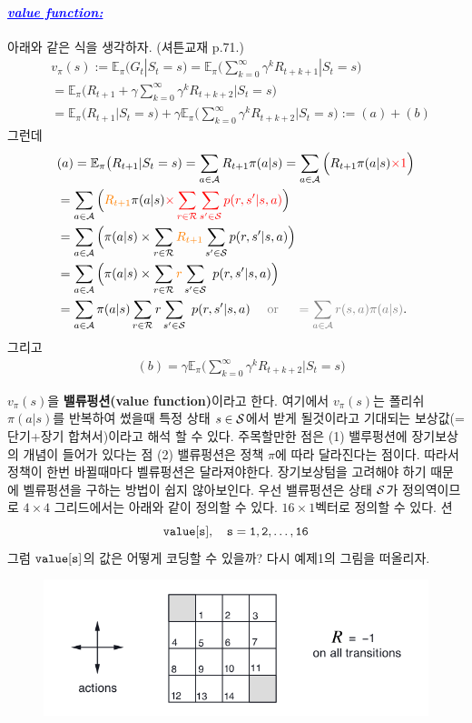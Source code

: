 \documentclass[12pt,oneside,english,a4paper]{article}
\newcommand{\parablue}[1]{\paragraph{\Large\textcolor{blue}{\it\underline{\textbf{#1:}}}}\Large}
\begin{document}
\parablue{value function} 아래와 같은 식을 생각하자. (셔튼교재 p.71.)
\begin{align*}
& v_{\pi}(s):=\mathbb{E}_{\pi}(G_t|S_t=s)= \mathbb{E}_{\pi} \Big( \sum_{k=0}^{\infty}\gamma^k R_{t+k+1} | S_t=s\Big)\\ 
&=\mathbb{E}_{\pi} \Big(R_{t+1}+\gamma \sum_{k=0}^{\infty}\gamma^k R_{t+k+2} | S_t=s\Big)\\
&=\mathbb{E}_{\pi} \big(R_{t+1}|S_t=s)+\gamma \mathbb{E}_{\pi}\Big(\sum_{k=0}^{\infty}\gamma^k R_{t+k+2} \Big| S_t=s\Big):=(a)+(b)
\end{align*}
그런데 
\begin{align*}
& (a)=\mathbb{E}_{\pi} \big(R_{t+1}|S_t=s)=\sum_{a \in {\cal A}} R_{t+1}\pi(a|s)=\sum_{a\in{\cal A}}\Big(R_{t+1}\pi(a|s)\textcolor{red}{\times{1}}\Big) \\
& = \sum_{a\in{\cal A}}\Big(\textcolor{orange}{R_{t+1}}\pi(a|s)\textcolor{red}{\times\sum_{r\in{\cal R}}\sum_{s'\in{\cal S}}p(r,s'|s,a)}\Big) \\ 
& = \sum_{a\in{\cal A}}\Big(\pi(a|s)\times \sum_{r\in{\cal R}}\textcolor{orange}{R_{t+1}}\sum_{s'\in{\cal S}}  p(r,s'|s,a)\Big) \\
& = \sum_{a\in{\cal A}}\Big(\pi(a|s)\times \sum_{r\in{\cal R}}\textcolor{orange}{r}\sum_{s'\in{\cal S}}  ~p(r,s'|s,a)\Big) \\
& = \sum_{a\in{\cal A}}\pi(a|s) \sum_{r\in{\cal R}}r\sum_{s'\in{\cal S}}  ~p(r,s'|s,a) \quad \textcolor{gray}{\mbox{ or } \quad =\sum_{a \in{\cal A}}r(s,a)\pi(a|s)}. 
\end{align*}
그리고 
\begin{align*}
& (b)= \gamma \mathbb{E}_{\pi}\Big(\sum_{k=0}^{\infty}\gamma^k R_{t+k+2} \Big| S_t=s\Big)
\end{align*}

$v_{\pi}(s)$을 \textbf{밸류펑션(value function)}이라고 한다. 여기에서 $v_{\pi}(s)$는 폴리쉬 $\pi(a|s)$를 반복하여 썼을때 특정 상태 $s \in {\cal S}$에서 받게 될것이라고 기대되는 보상값(=단기+장기 합쳐서)이라고 해석 할 수 있다. 주목할만한 점은 (1) 밸루펑션에 장기보상의 개념이 들어가 있다는 점 (2) 밸류펑션은 정책 $\pi$에 따라 달라진다는 점이다. 따라서 정책이 한번 바뀔때마다 벨류펑션은 달라져야한다. 장기보상텀을 고려해야 하기 때문에 벨류펑션을 구하는 방법이 쉽지 않아보인다. 우선 밸류펑션은 상태 ${\cal S}$가 정의역이므로 $4\times4$ 그리드에서는 아래와 같이 정의할 수 있다. $16\times 1$벡터로 정의할 수 있다. 션
\[
{\tt value[s], \quad s=1,2,\dots, 16}
\]
그럼 ${\tt value[s]}$의 값은 어떻게 코딩할 수 있을까? 다시 예제1의 그림을 떠올리자. 
\begin{figure}[h]
\center
\includegraphics[width=1\textwidth]{Fig4-1.png}
\end{figure}
\end{document}
